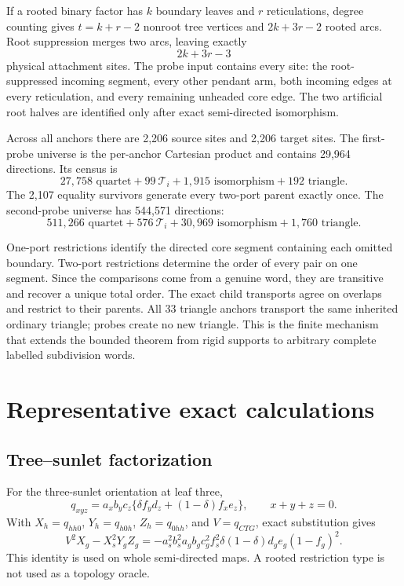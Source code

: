 \documentclass[11pt]{article}
\theoremstyle{remark}
\newcommand{\Ti}{\mathcal T_i}
\begin{document}
If a rooted binary factor has \(k\) boundary leaves and \(r\) reticulations,
degree counting gives \(t=k+r-2\) nonroot tree vertices and
\(2k+3r-2\) rooted arcs.  Root suppression merges two arcs, leaving exactly
\[
 2k+3r-3
\]
physical attachment sites.  The probe input contains every site: the
root-suppressed incoming segment, every other pendant arm, both incoming
edges at every reticulation, and every remaining unheaded core edge.  The two
artificial root halves are identified only after exact semi-directed
isomorphism.

Across all anchors there are 2,206 source sites and 2,206 target sites.  The
first-probe universe is the per-anchor Cartesian product and contains 29,964
directions.  Its census is
\[
27,758\text{ quartet}+99\ \Ti+1,915\text{ isomorphism}
+192\text{ triangle}.
\]
The 2,107 equality survivors generate every two-port parent exactly once.
The second-probe universe has 544,571 directions:
\[
511,266\text{ quartet}+576\ \Ti+30,969\text{ isomorphism}
+1,760\text{ triangle}.
\]

One-port restrictions identify the directed core segment containing each
omitted boundary.  Two-port restrictions determine the order of every pair on
one segment.  Since the comparisons come from a genuine word, they are
transitive and recover a unique total order.  The exact child transports
agree on overlaps and restrict to their parents.  All 33 triangle anchors
transport the same inherited ordinary triangle; probes create no new
triangle.  This is the finite mechanism that extends the bounded theorem from
rigid supports to arbitrary complete labelled subdivision words.

\section{Representative exact calculations}\label{sec:calculations}

\subsection{Tree--sunlet factorization}

For the three-sunlet orientation at leaf three,
\[
q_{xyz}=a_xb_yc_z\{\delta f_yd_z+(1-\delta)f_xe_z\},\qquad x+y+z=0.
\]
With \(X_h=q_{hh0}\), \(Y_h=q_{h0h}\), \(Z_h=q_{0hh}\), and
\(V=q_{CTG}\), exact substitution gives
\[
V^2X_g-X_s^2Y_gZ_g=
-a_s^2b_s^2a_gb_gc_g^2f_s^2\delta(1-\delta)d_ge_g(1-f_g)^2.
\]
This identity is used on whole semi-directed maps.  A rooted restriction type
is not used as a topology oracle.
\end{document}
